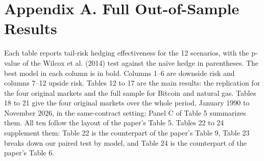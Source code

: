 \documentclass[11pt,letterpaper]{article}
\begin{document}
\clearpage

\section*{Appendix A. Full Out-of-Sample Results}

{\small Each table reports tail-risk hedging effectiveness for the 12 scenarios, with the p-value of the Wilcox et al. (2014) test against the naïve hedge in parentheses. The best model in each column is in bold. Columns 1–6 are downside risk and columns 7–12 upside risk. Tables 12 to 17 are the main results: the replication for the four original markets and the full sample for Bitcoin and natural gas. Tables 18 to 21 give the four original markets over the whole period, January 1990 to November 2026, in the same-contract setting; Panel C of Table 5 summarizes them. All ten follow the layout of the paper's Table 5. Tables 22 to 24 supplement them: Table 22 is the counterpart of the paper's Table 9, Table 23 breaks down our paired test by model, and Table 24 is the counterpart of the paper's Table 6.\par}
\end{document}
